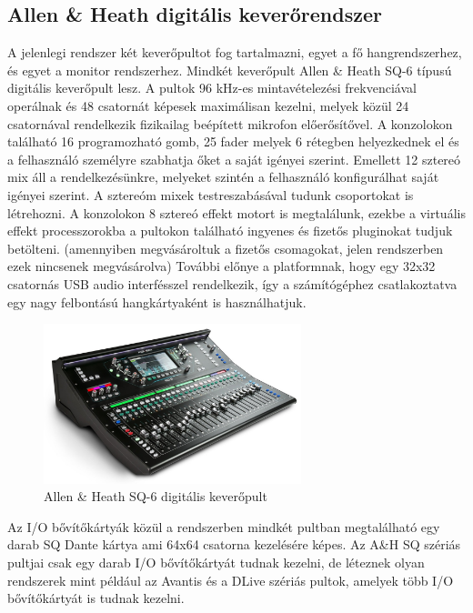 \subsection{Allen \& Heath digitális keverőrendszer}
A jelenlegi rendszer két keverőpultot fog tartalmazni, egyet a fő hangrendszerhez, és egyet a monitor rendszerhez.
Mindkét keverőpult Allen \& Heath SQ-6 típusú digitális keverőpult lesz.
A pultok 96 kHz-es mintavételezési frekvenciával operálnak és 48 csatornát képesek maximálisan kezelni, melyek közül 
24 csatornával rendelkezik fizikailag beépített mikrofon előerősítővel. A konzolokon található 16 programozható gomb,
25 fader melyek 6 rétegben helyezkednek el és a felhasználó személyre szabhatja őket a saját igényei szerint. 
Emellett 12 sztereó mix áll a rendelkezésünkre, melyeket szintén a felhasználó konfigurálhat saját igényei szerint.
A sztereóm mixek testreszabásával tudunk csoportokat is létrehozni.
A konzolokon 8 sztereó effekt motort is megtalálunk, ezekbe a virtuális effekt processzorokba a pultokon található ingyenes és fizetős 
pluginokat tudjuk betölteni. (amennyiben megvásároltuk a fizetős csomagokat, jelen rendszerben ezek nincsenek megvásárolva)
További előnye a platformnak, hogy egy 32x32 csatornás USB audio interfésszel rendelkezik, így a számítógéphez csatlakoztatva
egy nagy felbontású hangkártyaként is használhatjuk.~\cite{AHSQ}
\begin{figure}[H]
	\centering
	\includegraphics[width=75mm, keepaspectratio]{figures/sq6.jpg}
	\caption{Allen \& Heath SQ-6 digitális keverőpult}\label{fig:sq6}
\end{figure}
Az I/O bővítőkártyák közül a rendszerben mindkét pultban megtalálható egy darab SQ Dante kártya ami 64x64 csatorna
kezelésére képes. Az A\&H SQ szériás pultjai csak egy darab I/O bővítőkártyát tudnak kezelni, de léteznek
olyan rendszerek mint például az Avantis és a DLive szériás pultok, amelyek több I/O bővítőkártyát is tudnak kezelni.
